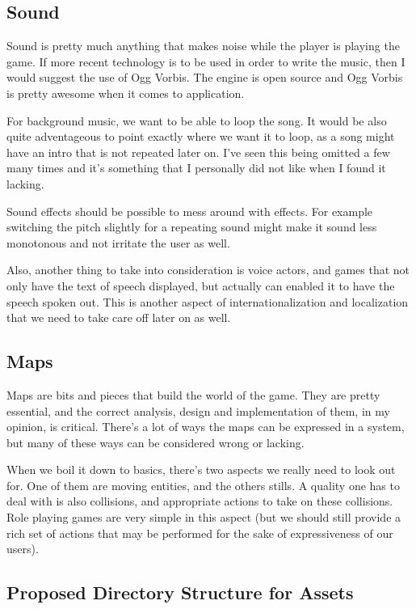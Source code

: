 \subsection{Sound}

Sound is pretty much anything that makes noise while the player is playing the
game. If more recent technology is to be used in order to write the music, then
I would suggest the use of Ogg Vorbis. The engine is open source and Ogg Vorbis
is pretty awesome when it comes to application.

For background music, we want to be able to loop the song. It would be also 
quite adventageous to point exactly where we want it to loop, as a song might
have an intro that is not repeated later on. I've seen this being omitted a few
many times and it's something that I personally did not like when I found it 
lacking.

Sound effects should be possible to mess around with effects. For example 
switching the pitch slightly for a repeating sound might make it sound less 
monotonous and not irritate the user as well. 

Also, another thing to take into consideration is voice actors, and games that
not only have the text of speech displayed, but actually can enabled it to have
the speech spoken out. This is another aspect of internationalization and 
localization that we need to take care off later on as well.

\subsection{Maps}

Maps are bits and pieces that build the world of the game. They are pretty
essential, and the correct analysis, design and implementation of them, in my
opinion, is critical. There's a lot of ways the maps can be expressed in a 
system, but many of these ways can be considered wrong or lacking.

When we boil it down to basics, there's two aspects we really need to look out
for. One of them are moving entities, and the others stills. A quality one has 
to deal with is also collisions, and appropriate actions to take on these 
collisions. Role playing games are very simple in this aspect (but we should
still provide a rich set of actions that may be performed for the sake of 
expressiveness of our users).

\subsection{Proposed Directory Structure for Assets}

